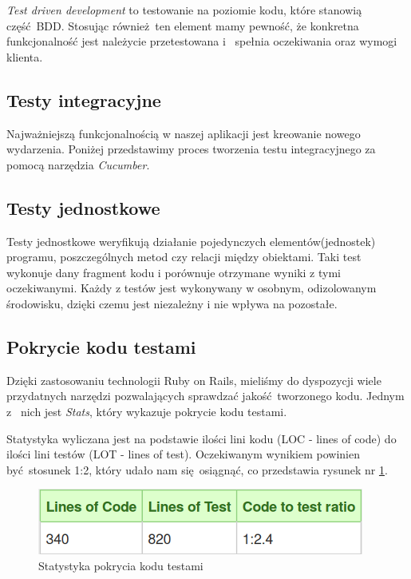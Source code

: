 \begin{itemize}
        \emph{Test driven development} to testowanie na poziomie kodu, które stanowią część BDD. Stosując również ten element mamy pewność, że konkretna funkcjonalność jest należycie przetestowana i~ spełnia oczekiwania oraz wymogi klienta.
    \end{itemize}

  \subsection{Testy integracyjne}
    Najważniejszą funkcjonalnością w naszej aplikacji jest kreowanie nowego wydarzenia. Poniżej przedstawimy proces tworzenia testu integracyjnego za pomocą narzędzia \emph{Cucumber}.

    
  \subsection{Testy jednostkowe}
    Testy jednostkowe weryfikują działanie pojedynczych elementów(jednostek) programu, poszczególnych metod czy relacji między obiektami. Taki test wykonuje dany fragment kodu i porównuje otrzymane wyniki z tymi oczekiwanymi. Każdy z testów jest wykonywany w osobnym, odizolowanym środowisku, dzięki czemu jest niezależny i nie wpływa na pozostałe.

    
  \clearpage
  \subsection{Pokrycie kodu testami}
    Dzięki zastosowaniu technologii Ruby on Rails, mieliśmy do dyspozycji wiele przydatnych narzędzi pozwalających sprawdzać jakość tworzonego kodu. Jednym z~ nich jest \emph{Stats}, który wykazuje pokrycie kodu testami.

    Statystyka wyliczana jest na podstawie ilości lini kodu (LOC - lines of code) do ilości lini testów (LOT - lines of test). Oczekiwanym wynikiem powinien być stosunek 1:2, który udało nam się osiągnąć, co przedstawia rysunek nr \ref{fig:stat}.
    \begin{figure}[h]
      \centering
      \includegraphics[scale=0.5]{images/loc_table.png}
      \caption{Statystyka pokrycia kodu testami}
      \label{fig:stat}
    \end{figure}

